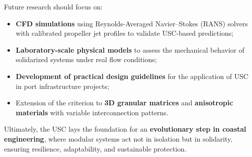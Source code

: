 \documentclass[Journal,letterpaper]{ascelike-new}
\begin{document}
Future research should focus on:

\begin{itemize}
\item  \textbf{CFD simulations} using Reynolds-Averaged Navier--Stokes (RANS) solvers with calibrated propeller jet profiles to validate USC-based predictions;

\item  \textbf{Laboratory-scale physical models} to assess the mechanical behavior of solidarized systems under real flow conditions;

\item  \textbf{Development of practical design guidelines} for the application of USC in port infrastructure projects;

\item  Extension of the criterion to \textbf{3D granular matrices} and \textbf{anisotropic materials} with variable interconnection patterns.
\end{itemize}

Ultimately, the USC lays the foundation for an \textbf{evolutionary step in coastal engineering}, where modular systems act not in isolation but in solidarity, ensuring resilience, adaptability, and sustainable protection.

\nocite{*}

%
%

%
\end{document}
